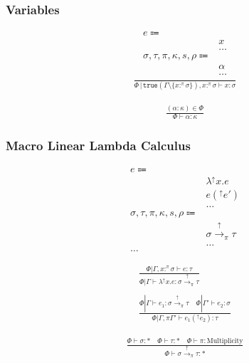\documentclass {article}
\begin{document}
\subsubsection{Variables}
\begin{align*}
e \Coloneqq & \\
& x \tag{Variable} \\
& \dots \\
\sigma, \tau, \pi, \kappa, s, \rho \Coloneqq & \\
& \alpha \tag{Type Variable} \\
& \dots
\end{align*}
\begin{gather*}
\frac
{}
{\Phi \, | \, \texttt{true} (\Gamma \setminus \{x :^\pi \sigma\}), x :^\pi \sigma  \vdash x : \sigma}
\end{gather*}

\begin{gather*}
\frac
{(\alpha : \kappa) \in \Phi}
{\Phi \vdash \alpha : \kappa}
\end{gather*}

\subsubsection{Macro Linear Lambda Calculus}
\begin{align*}
e \Coloneqq & \\
& \lambda^\uparrow x. e \tag{Macro Lambda}\\
& e(^\uparrow e') \tag{Macro Application}\\
& \dots \\
\sigma, \tau, \pi, \kappa, s, \rho \Coloneqq & \\
& \sigma \xrightarrow{\uparrow}_\pi \tau \tag{Macro} \\
& \dots \\
\dots
\end{align*}

\begin{gather*}
\frac
{\Phi | \Gamma, x :^\pi \sigma \vdash e : \tau}
{\Phi | \Gamma \vdash \lambda^\uparrow x. e : \sigma \xrightarrow{\uparrow}_\pi \tau } \\
\\
\frac
{\Phi | \Gamma \vdash e_1 : \sigma \xrightarrow{\uparrow}_\pi \tau \quad \Phi | \Gamma' \vdash e_2 : \sigma}
{\Phi | \Gamma, \pi \Gamma' \vdash e_1(^\uparrow e_2) : \tau}
\end{gather*}

\begin{gather*}
\frac
{\Phi \vdash \sigma : * \quad \Phi \vdash \tau : * \quad \Phi \vdash \pi : \text{Multiplicity}}
{\Phi \vdash \sigma \xrightarrow{\uparrow}_\pi \tau  : * }
\end{gather*}
\end{document}
